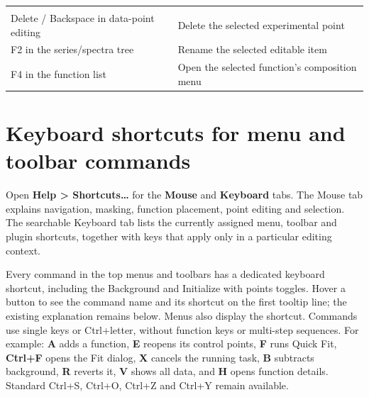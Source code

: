 \documentclass[
  10pt,
  a4paper,
  oneside]{scrreprt}
\begin{document}
\begin{longtable}[]{@{}ll@{}}
\begin{minipage}[t]{0.47\columnwidth}
\end{minipage}\tabularnewline
\begin{minipage}[t]{0.47\columnwidth}\raggedright
Delete / Backspace in data-point editing\strut
\end{minipage} & \begin{minipage}[t]{0.47\columnwidth}\raggedright
Delete the selected experimental point\strut
\end{minipage}\tabularnewline
\begin{minipage}[t]{0.47\columnwidth}\raggedright
F2 in the series/spectra tree\strut
\end{minipage} & \begin{minipage}[t]{0.47\columnwidth}\raggedright
Rename the selected editable item\strut
\end{minipage}\tabularnewline
\begin{minipage}[t]{0.47\columnwidth}\raggedright
F4 in the function list\strut
\end{minipage} & \begin{minipage}[t]{0.47\columnwidth}\raggedright
Open the selected function's composition menu\strut
\end{minipage}\tabularnewline
\bottomrule
\end{longtable}

\hypertarget{keyboard-shortcuts-for-menu-and-toolbar-commands}{%
\section{Keyboard shortcuts for menu and toolbar
commands}\label{keyboard-shortcuts-for-menu-and-toolbar-commands}}

Open \textbf{Help \textgreater{} Shortcuts\ldots{}} for the
\textbf{Mouse} and \textbf{Keyboard} tabs. The Mouse tab explains
navigation, masking, function placement, point editing and selection.
The searchable Keyboard tab lists the currently assigned menu, toolbar
and plugin shortcuts, together with keys that apply only in a particular
editing context.

Every command in the top menus and toolbars has a dedicated keyboard
shortcut, including the Background and Initialize with points toggles.
Hover a button to see the command name and its shortcut on the first
tooltip line; the existing explanation remains below. Menus also display
the shortcut. Commands use single keys or Ctrl+letter, without function
keys or multi-step sequences. For example: \textbf{A} adds a function,
\textbf{E} reopens its control points, \textbf{F} runs Quick Fit,
\textbf{Ctrl+F} opens the Fit dialog, \textbf{X} cancels the running
task, \textbf{B} subtracts background, \textbf{R} reverts it, \textbf{V}
shows all data, and \textbf{H} opens function details. Standard Ctrl+S,
Ctrl+O, Ctrl+Z and Ctrl+Y remain available.
\end{document}
